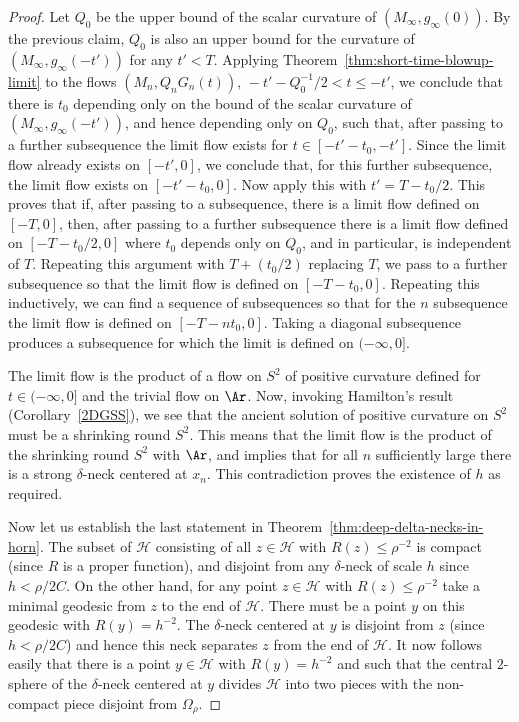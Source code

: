 \begin{proof}
Let $Q_0$ be the upper bound of the scalar curvature of
$(M_\infty,g_\infty(0))$.  By the previous claim, $Q_0$ is also an
upper bound for the curvature of $(M_\infty,g_\infty(-t'))$ for any
$t'<T$. Applying Theorem~\ref{thm:short-time-blowup-limit} to the flows
$(M_n,Q_nG_n(t)),\, -t'-Q_0^{-1}/2< t\le -t'$, we conclude that
there is $t_0$ depending only on the bound of the scalar curvature
of $(M_\infty,g_\infty(-t'))$, and hence depending only on $Q_0$,
such that, after passing to a further subsequence the limit flow
exists for $t\in [-t'-t_0,-t']$. Since the limit flow already exists
on $[-t',0]$, we conclude that, for this further subsequence, the
limit flow exists on $[-t'-t_0,0]$. Now apply this with
$t'=T-t_0/2$. This proves that if, after passing to a subsequence,
there is a limit flow defined on $[-T,0]$, then, after passing to a
further subsequence there is a limit flow defined on $[-T-t_0/2,0]$
where $t_0$ depends only on $Q_0$, and in particular, is independent
of $T$. Repeating this argument with $T+(t_0/2)$ replacing $T$, we
pass to a further subsequence so that the limit flow is defined on
$[-T-t_0,0]$. Repeating this inductively, we can find a sequence of
subsequences so that for the $n$ subsequence the limit flow is
defined on $[-T-nt_0,0]$. Taking a diagonal subsequence produces a
subsequence for which the limit is defined on $(-\infty,0]$.


The limit flow is the product of a flow on $S^2$ of positive
curvature defined for $t\in (-\infty,0]$ and the trivial flow on
$\Ar$. Now, invoking Hamilton's result (Corollary~\ref{2DGSS}), we
see that the ancient solution of positive curvature on $S^2$ must be
a shrinking round $S^2$. This means that the limit flow is the
product of the shrinking round $S^2$ with $\Ar$, and implies that
for all $n$ sufficiently large there is a strong $\delta$-neck
centered at $x_n$. This contradiction proves the existence of $h$ as
required.


Now let us establish the last statement in Theorem~\ref{thm:deep-delta-necks-in-horn}. The
subset of ${\mathcal H}$ consisting of all $z\in {\mathcal H}$ with
$R(z)\le \rho^{-2}$ is compact (since $R$ is a proper function), and
disjoint from any $\delta$-neck of scale $h$ since $h<\rho/2C$. On
the other hand, for any point $z\in {\mathcal H}$ with $R(z)\le
\rho^{-2}$ take a minimal geodesic from $z$ to the end of ${\mathcal
H}$. There must be a point $y$ on this geodesic with $R(y)=h^{-2}$.
The $\delta$-neck centered at $y$ is disjoint from $z$ (since
$h<\rho/2C$) and hence this neck separates $z$ from the end of
${\mathcal H}$. It now follows easily that there is a point $y\in
{\mathcal H}$ with $R(y)=h^{-2}$ and such that the central
$2$-sphere of the $\delta$-neck centered at $y$ divides ${\mathcal
H}$ into two pieces with the non-compact piece disjoint from
$\Omega_\rho$.
\end{proof}


